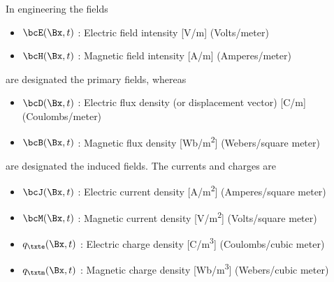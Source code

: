 %
%
In engineering the fields
\begin{itemize}
	\item \( \bcE(\Bx, t) \) : Electric field intensity [\si{V/m}] (Volts/meter)
	\item \( \bcH(\Bx, t) \) : Magnetic field intensity [\si{A/m}] (Amperes/meter)
\end{itemize}
are designated the primary fields, whereas
\begin{itemize}
	\item \( \bcD(\Bx, t) \) : Electric flux density (or displacement vector) [\si{C/m}] (Coulombs/meter)
	\item \( \bcB(\Bx, t) \) : Magnetic flux density [\si{Wb/m^2}] (Webers/square meter)
\end{itemize}
are designated the induced fields.  The currents and charges are
\begin{itemize}
	\item \( \bcJ(\Bx, t) \) : Electric current density [\si{A/m^2}] (Amperes/square meter)
	\item \( \bcM(\Bx, t) \) : Magnetic current density [\si{V/m^2}] (Volts/square meter)
	\item \( q_\txte(\Bx, t) \) : Electric charge density [\si{C/m^3}] (Coulombs/cubic meter)
	\item \( q_\txtm(\Bx, t) \) : Magnetic charge density [\si{Wb/m^3}] (Webers/cubic meter)
\end{itemize}
